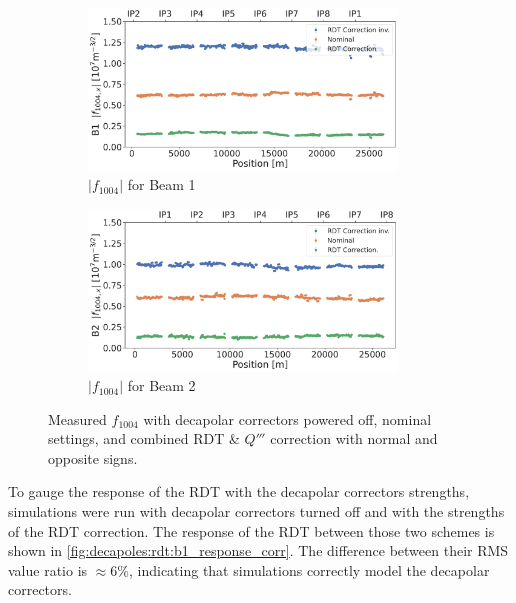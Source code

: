 \begin{figure}[!htb]
    \centering
    \begin{subfigure}{1\textwidth}
        \includegraphics[width=0.9\textwidth]{./images/f1004/f1004x_corrections_B1.pdf}
        \caption{$|f_{1004}|$ for Beam 1}
        \vspace{0.5cm}
    \end{subfigure}
    \begin{subfigure}{1\textwidth}
        \includegraphics[width=0.9\textwidth]{./images/f1004/f1004x_corrections_B2.pdf}
        \caption{$|f_{1004}|$ for Beam 2}
    \end{subfigure}
    \caption{Measured $f_{1004}$ with decapolar correctors powered off, nominal settings, and
    combined RDT \& $Q'''$ correction with normal and opposite signs.}
    \label{fig:decapoles:rdts:f1004_correction_B1_B2}
\end{figure}

To gauge the response of the RDT with the decapolar correctors strengths, simulations were run with
decapolar correctors turned off and with the strengths of the RDT correction. The response of
the RDT between those two schemes is shown in 
\cref{fig:decapoles:rdt:b1_response_corr}. The difference between their RMS value ratio is $\approx
6\%$, indicating that simulations correctly model the decapolar correctors.

